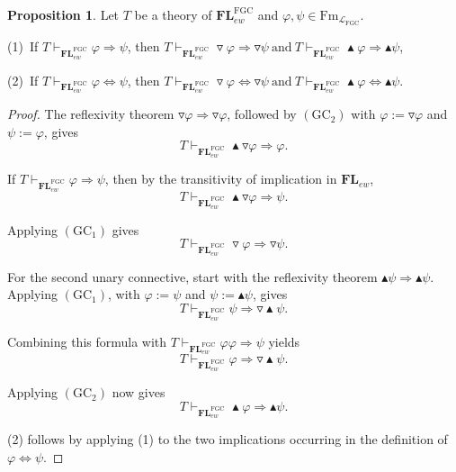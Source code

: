 \documentclass[final,12pt,times]{elsarticle}
\theoremstyle{plain}
\theoremstyle{definition}
\newtheorem{proposition}[definition]{Proposition}
\theoremstyle{break}
\begin{document}
\begin{proposition}\label{prop:FGC-monotonicity}
Let $T$ be a theory of $\mathbf{FL}^{\mathrm{FGC}}_{ew}$ and
$\varphi,\psi\in\mathrm{Fm}_{\mathcal L_{\mathrm{FGC}}}$.

 (1)~If
 $T\vdash_{\mathbf{FL}^{\mathrm{FGC}}_{ew}}\varphi\Rightarrow\psi$, then
 $T\vdash_{\mathbf{FL}^{\mathrm{FGC}}_{ew}}
   \triangledown\varphi\Rightarrow\triangledown\psi
 ~\text{and}~
 T\vdash_{\mathbf{FL}^{\mathrm{FGC}}_{ew}}
   \blacktriangle\varphi\Rightarrow\blacktriangle\psi$,
 
 
 (2)~If
 $T\vdash_{\mathbf{FL}^{\mathrm{FGC}}_{ew}}
   \varphi\Leftrightarrow\psi$, then $T\vdash_{\mathbf{FL}^{\mathrm{FGC}}_{ew}}
   \triangledown\varphi\Leftrightarrow\triangledown\psi
 ~\text{and}~
 T\vdash_{\mathbf{FL}^{\mathrm{FGC}}_{ew}}
   \blacktriangle\varphi\Leftrightarrow\blacktriangle\psi$.
\end{proposition}

\begin{proof}
The reflexivity theorem
$\triangledown\varphi\Rightarrow\triangledown\varphi$, followed by
$(\mathrm{GC}_2)$ with $\varphi:=\triangledown\varphi$ and
$\psi:=\varphi$, gives
\[
 T\vdash_{\mathbf{FL}^{\mathrm{FGC}}_{ew}}
 \blacktriangle\triangledown\varphi\Rightarrow\varphi.
\]

If $T\vdash_{\mathbf{FL}^{\mathrm{FGC}}_{ew}}\varphi\Rightarrow\psi$, then by the transitivity of implication in $\mathbf{FL}_{ew}$,
\[
 T\vdash_{\mathbf{FL}^{\mathrm{FGC}}_{ew}}
 \blacktriangle\triangledown\varphi\Rightarrow\psi.
\]

Applying $(\mathrm{GC}_1)$ gives
\[
 T\vdash_{\mathbf{FL}^{\mathrm{FGC}}_{ew}}
 \triangledown\varphi\Rightarrow\triangledown\psi.
\]

For the second unary connective, start with the reflexivity theorem
$\blacktriangle\psi\Rightarrow\blacktriangle\psi$.  Applying $(\mathrm{GC}_1)$, with
$\varphi:=\psi$ and $\psi:=\blacktriangle\psi$, gives
\[
 T\vdash_{\mathbf{FL}^{\mathrm{FGC}}_{ew}}
 \psi\Rightarrow\triangledown\blacktriangle\psi.
\]

Combining this formula with $T\vdash_{\mathbf{FL}^{\mathrm{FGC}}_{ew}}\varphi\varphi\Rightarrow\psi$ yields
\[
 T\vdash_{\mathbf{FL}^{\mathrm{FGC}}_{ew}}
 \varphi\Rightarrow\triangledown\blacktriangle\psi.
\]

Applying $(\mathrm{GC}_2)$ now gives
\[
 T\vdash_{\mathbf{FL}^{\mathrm{FGC}}_{ew}}
 \blacktriangle\varphi\Rightarrow\blacktriangle\psi.
\]

(2) follows by applying (1) to the two
implications occurring in the definition of
$\varphi\Leftrightarrow\psi$.
\end{proof}
\end{document}
